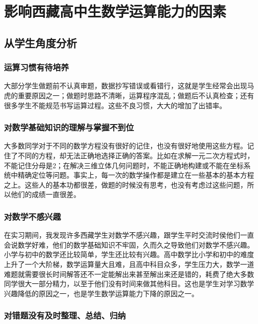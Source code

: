 \chapter{影响西藏高中生数学运算能力的因素}


\section{从学生角度分析}

\subsection{运算习惯有待培养}

大部分学生做题前不认真审题，数据抄写错误或看错行，这就是学生经常会出现马虎的重要原因之一；做题时思路不清晰，运算程序混乱；做题后不认真检查；还有很多学生不能规范书写运算过程。这些不良习惯，大大的增加了出错率。


\subsection{对数学基础知识的理解与掌握不到位}

大多数同学对于不同的数学方程没有很好的记住，也没有很好地使用这些方程。记住了不同的方程，却无法正确地选择正确的答案。比如在求解一元二次方程式时，不能记住分母是2；在解决三维立体几何问题时，不能正确地构建或不能在坐标系统中精确定位等问题。事实上，每一次的数学操作都是建立在一些基本的基本方程之上。这些人的基本功都很差，做题的时候没有思考，也没有考虑过这些问题，所以他们的成绩一直很差。


\subsection{对数学不感兴趣
}

在实习期间，我发现许多西藏学生对数学不感兴趣，跟学生平时交流时侯他们一直会说数学好难，他们的数学基础知识不牢固，久而久之导致他们对数学不感兴趣。小学与初中的数学还比较简单，学生还比较有兴趣。高中数学比小学和初中的难度上升了一个大阶梯，数学运算量大且难，且高中科目众多，学生压力大，数学一道难题就需要很长时间解答还不一定能解出来甚至解出来还是错的，耗费了绝大多数同学很大一部分精力，以至于他们没有时间来做其他科目。这也是学生对学习数学兴趣降低的原因之一，也是学生数学运算能力下降的原因之一。



\subsection{对错题没有及时整理、总结、归纳}

